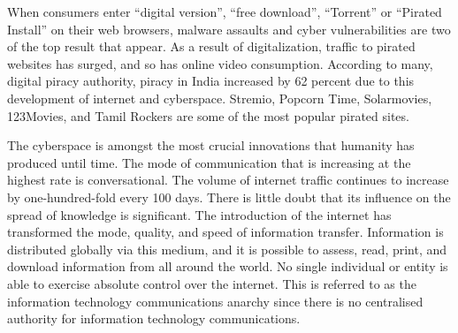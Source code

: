 \setcounter{figure}{0}
\setcounter{table}{0}
\setcounter{footnote}{0}


\begin{multicols}{2}



\noi
When consumers enter “digital version”, “free download”, “Torrent” or “Pirated Install” on
their web browsers, malware assaults and cyber vulnerabilities are two of the top result that
appear. As a result of digitalization, traffic to pirated websites has surged, and so has online
video consumption. According to many, digital piracy authority, piracy in India increased by
62 percent due to this development of internet and cyberspace. Stremio, Popcorn Time,
Solarmovies, 123Movies, and Tamil Rockers are some of the most popular pirated sites.


\noi
The cyberspace is amongst the most crucial innovations that humanity has produced until
time. The mode of communication that is increasing at the highest rate is conversational. The
volume of internet traffic continues to increase by one-hundred-fold every 100 days. There is
little doubt that its influence on the spread of knowledge is significant. The introduction of
the internet has transformed the mode, quality, and speed of information transfer. Information
is distributed globally via this medium, and it is possible to assess, read, print, and download
information from all around the world. No single individual or entity is able to exercise
absolute control over the internet. This is referred to as the information technology
communications anarchy since there is no centralised authority for information technology
communications.



\end{multicols}
